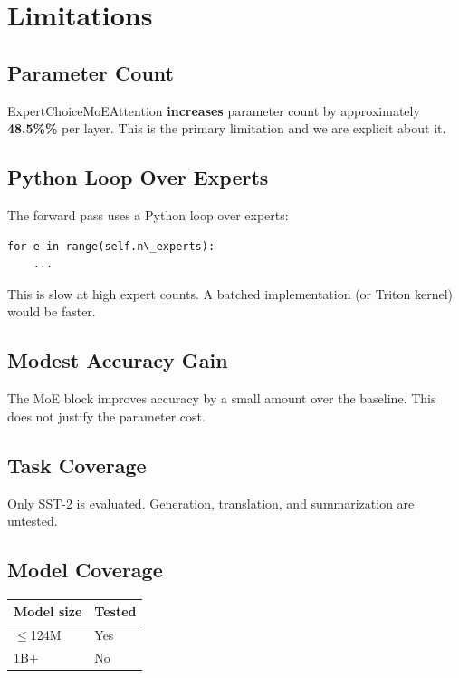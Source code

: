 \section{Limitations}

\subsection{Parameter Count}

ExpertChoiceMoEAttention \textbf{increases} parameter count by approximately 
\textbf{48.5\%\%} per layer. This is the primary limitation and we are 
explicit about it.

\subsection{Python Loop Over Experts}

The forward pass uses a Python loop over experts:

\begin{lstlisting}
for e in range(self.n\_experts):
    ...
\end{lstlisting}

This is slow at high expert counts. A batched implementation (or Triton 
kernel) would be faster.

\subsection{Modest Accuracy Gain}

The MoE block improves accuracy by a small amount over the baseline. This 
does not justify the parameter cost.

\subsection{Task Coverage}

Only SST-2 is evaluated. Generation, translation, and summarization are 
untested.

\subsection{Model Coverage}

\begin{table}[H]
\centering
\small
\begin{tabular}{ll}
\toprule
\textbf{Model size} & \textbf{Tested} \\
\midrule
$\le$124M & Yes \\
1B+ & No \\
\bottomrule
\end{tabular}
\end{table}

